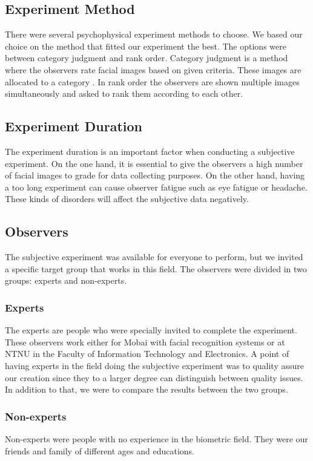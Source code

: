 \subsection{Experiment Method}
There were several psychophysical experiment methods to choose. We based our choice on the method that fitted our experiment the best. The options were between category judgment and rank order. Category judgment is a method where the observers rate facial images based on given criteria. These images are allocated to a category \cite{Xphdthesis}. In rank order the observers are shown multiple images simultaneously and asked to rank them according to each other. 

\subsection{Experiment Duration}
The experiment duration is an important factor when conducting a subjective experiment. On the one hand, it is essential to give the observers a high number of facial images to grade for data collecting purposes. On the other hand, having a too long experiment can cause observer fatigue such as eye fatigue or headache. These kinds of disorders will affect the subjective data negatively.

\subsection{Observers}
The subjective experiment was available for everyone to perform, but we invited a specific target group that works in this field. The observers were divided in two groups: experts and non-experts.

\subsubsection*{Experts}
The experts are people who were specially invited to complete the experiment. These observers work either for Mobai with facial recognition systems or at NTNU in the Faculty of Information Technology and Electronics. A point of having experts in the field doing the subjective experiment was to quality assure our creation since they to a larger degree can distinguish between quality issues. In addition to that, we were to compare the results between the two groups. 

\subsubsection*{Non-experts}
Non-experts were people with no experience in the biometric field. They were our friends and family of different ages and educations.

